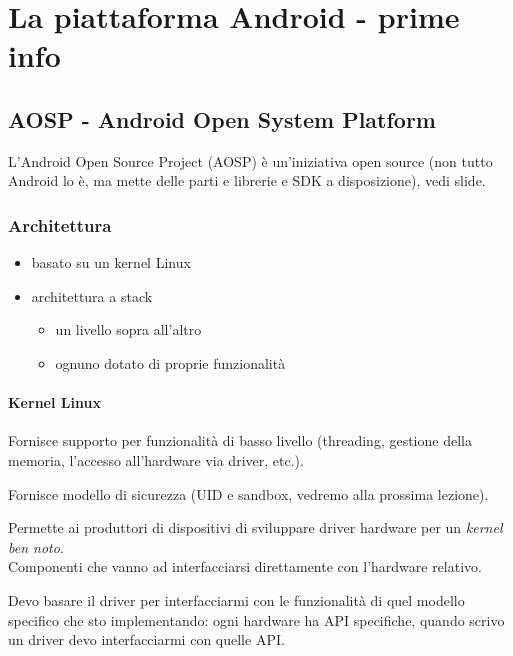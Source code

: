
\chapter{La piattaforma Android - prime info}
\section{AOSP - Android Open System Platform}
\par L'Android Open Source Project (AOSP) è un'iniziativa open source (non tutto Android lo è, ma mette delle parti e librerie e SDK a disposizione), vedi slide.

\subsection{Architettura}
\begin{itemize}
    \item basato su un kernel Linux
    \item architettura a stack
    \begin{itemize}
        \item un livello sopra all'altro
        \item ognuno dotato di proprie funzionalità
    \end{itemize}
\end{itemize}

\subsubsection{Kernel Linux}
\par Fornisce supporto per funzionalità di basso livello (threading, gestione della memoria, l'accesso all'hardware via driver, etc.).
\par Fornisce modello di sicurezza (UID e sandbox, vedremo alla prossima lezione).
\par Permette ai produttori di dispositivi di sviluppare driver hardware per un \textit{kernel ben noto}.\\
Componenti che vanno ad interfacciarsi direttamente con l'hardware relativo.
\par Devo basare il driver per interfacciarmi con le funzionalità di quel modello specifico che sto implementando: ogni hardware ha API specifiche, quando scrivo un driver devo interfacciarmi con quelle API.

